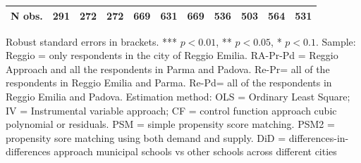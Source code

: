 \documentclass[12pt]{article}
\begin{document}
\begin{table}[ht]
\begin{center}
\begin{adjustbox}{width=1.2\textwidth,center=\textwidth}
\begin{tabular}{l*{10}{c}}
\hline
N obs. &  291 & 272 & 272 & 669 & 631 & 669 & 536 & 503 & 564 & 531 \\
\hline
\end{tabular}
\end{adjustbox}
\end{center}
\par

\vspace{1ex}
\par



{\footnotesize \raggedright{Robust standard errors in brackets. *** $p<0.01$, ** $p<0.05$, * $p<0.1$. Sample: Reggio = only respondents in the city of Reggio Emilia. RA-Pr-Pd = Reggio Approach and all the respondents in Parma and Padova. Re-Pr= all of the respondents in Reggio Emilia and Parma. Re-Pd= all of the respondents in Reggio Emilia and Padova. Estimation method: OLS = Ordinary Least Square; IV = Instrumental variable approach; CF = control function approach cubic polynomial or residuals. PSM = simple propensity score matching. PSM2 = propensity sore matching using both demand and supply. DiD = differences-in-differences approach municipal schools vs other schools across different cities} }
\end{table}
\end{document}
